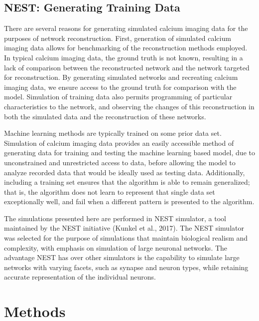 \documentclass[11pt]{article}
\begin{document}
\subsection{NEST: Generating Training Data}
There are several reasons for generating simulated calcium imaging data for the purposes of network reconstruction. First, generation of simulated calcium imaging data allows for benchmarking of the reconstruction methods employed. In typical calcium imaging data, the ground truth is not known, resulting in a lack of comparison between the reconstructed network and the network targeted for reconstruction. By generating simulated networks and recreating calcium imaging data, we ensure access to the ground truth for comparison with the model. Simulation of training data also permits programming of particular characteristics to the network, and observing the changes of this reconstruction in both the simulated data and the reconstruction of these networks.\par
Machine learning methods are typically trained on some prior data set. Simulation of calcium imaging data provides an easily accessible method of generating data for training and testing the machine learning based model, due to unconstrained and unrestricted access to data, before allowing the model to analyze recorded data that would be ideally used as testing data. Additionally, including a training set ensures that the algorithm is able to remain generalized; that is, the algorithm does not learn to represent that single data set exceptionally well, and fail when a different pattern is presented to the algorithm.\par
The simulations presented here are performed in NEST simulator, a tool maintained by the NEST initiative (Kunkel et al., 2017). The NEST simulator was selected for the purpose of simulations that maintain biological realism and complexity, with emphasis on simulation of large neuronal networks. The advantage NEST has over other simulators is the capability to simulate large networks with varying facets, such as synapse and neuron types, while retaining accurate representation of the individual neurons.\par

\section{Methods}
\end{document}
